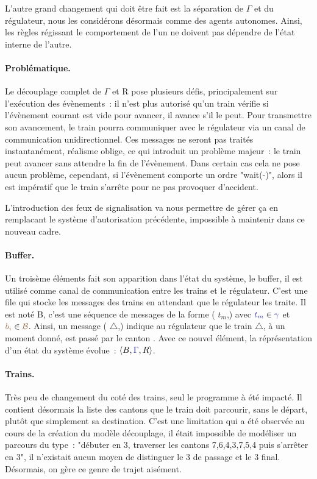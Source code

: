\documentclass[oneside, a4paper, 11pt]{book}
\newcommand{\trainFmt}[1]{{\color{traincolor} #1}}
\newcommand{\posFmt}[1]{{\color{poscolor}{#1}}}
\begin{document}
L'autre grand changement qui doit être fait est la séparation de \trainFmt{$\Gamma$} et du régulateur, nous les considérons désormais comme des agents autonomes. Ainsi, les règles régissant le comportement de l'un ne doivent pas dépendre de l'état interne de l'autre.



\paragraph{Problématique.} Le découplage complet de \trainFmt{$\Gamma$} et R pose plusieurs défis, principalement sur l'exécution des évènements~: il n'est plus autorisé qu'un train vérifie si l'évènement courant est vide pour avancer, il avance s'il le peut.
Pour transmettre son avancement, le train pourra communiquer avec le régulateur via un canal de communication unidirectionnel. Ces messages ne seront pas traités instantanément, réalisme oblige, ce qui introduit un problème majeur~: le train peut avancer sans attendre la fin de l'évènement.
Dans certain cas cela ne pose aucun problème, cependant, si l'évènement comporte un ordre "wait(-)", alors il est impératif que le train s'arrête pour ne pas provoquer d'accident.

L'introduction des feux de signalisation va nous permettre de gérer ça en remplacant le système d'autorisation précédente, impossible à maintenir dans ce nouveau cadre.

\paragraph{Buffer.} Un troisème éléments fait son apparition dans l'état du système, le buffer, il est utilisé comme canal de communication entre les trains et le régulateur. C'est une file qui stocke les messages des trains en attendant que le régulateur les traite. 
Il est noté B, c'est une séquence de messages de la forme (\trainFmt{$t_m$},\posFmt{$b_i$}) avec $\trainFmt{t_m} \in \trainFmt{\gamma}$ et $\posFmt{b_i} \in \posFmt{\mathcal{B}}$.
Ainsi, un message (\trainFmt{$\triangle$},\posFmt{8}) indique au régulateur que le train \trainFmt{$\triangle$}, à un moment donné, est passé par le canton \posFmt{8}. Avec ce nouvel élément, la réprésentation d'un état du système évolue~: $\langle B, \trainFmt{\Gamma}, R\rangle$.


\paragraph{Trains.} Très peu de changement du coté des trains, seul le programme à été impacté. Il contient désormais la liste des cantons que le train doit parcourir, sans le départ, plutôt que simplement sa destination.
C'est une limitation qui a été observée au cours de la création du modèle découplage, il était impossible de modéliser un parcours du type~: "débuter en 3, traverser les cantons 7,6,4,3,7,5,4 puis s'arrêter en 3", il n'existait aucun moyen de distinguer le 3 de passage et le 3 final. Désormais, on gère ce genre de trajet aisément.
\end{document}
